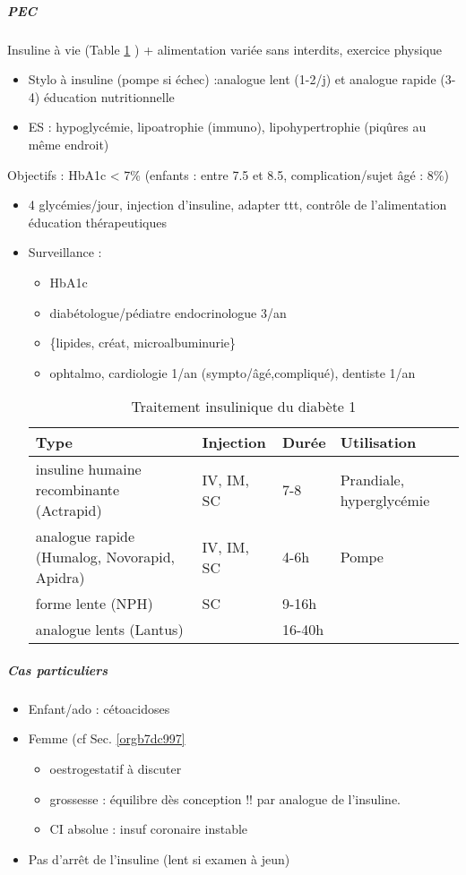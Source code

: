 \documentclass[11pt]{article}
\begin{document}
\subparagraph{PEC}
\label{sec:org1c860a3}
Insuline à vie (Table \ref{tab:org1f401a4} ) + alimentation variée sans interdits, exercice physique
\begin{itemize}
\item Stylo à insuline (pompe si échec) :analogue lent (1-2/j) et analogue rapide (3-4) \thus
éducation nutritionnelle
\item ES : hypoglycémie, lipoatrophie (immuno), lipohypertrophie (piqûres au même endroit)
\end{itemize}

Objectifs : HbA1c < 7\% (enfants : entre 7.5 et 8.5, complication/sujet âgé : 8\%)
\begin{itemize}
\item 4 glycémies/jour, injection d'insuline, adapter ttt, contrôle de l'alimentation \thus
éducation thérapeutiques
\item Surveillance :
\begin{itemize}
\item HbA1c
\item diabétologue/pédiatre endocrinologue 3/an
\item \{lipides, créat, microalbuminurie\}
\item ophtalmo, cardiologie 1/an (sympto/âgé,compliqué), dentiste 1/an
\end{itemize}

\begin{table}[htbp]
\caption{\label{tab:org1f401a4}
Traitement insulinique du diabète 1}
\centering
\begin{tabular}{llll}
Type & Injection & Durée & Utilisation\\
\hline
insuline humaine recombinante (Actrapid) & IV, IM, SC & 7-8 & Prandiale, hyperglycémie\\
analogue rapide (Humalog, Novorapid, Apidra) & IV, IM, SC & 4-6h & Pompe\\
forme lente (NPH) & SC & 9-16h & \\
analogue lents (Lantus) &  & 16-40h & \\
\end{tabular}
\end{table}
\end{itemize}


\subparagraph{Cas particuliers}
\label{sec:org6eb9d3d}
\begin{itemize}
\item Enfant/ado : \danger cétoacidoses
\item Femme (cf Sec. \ref{orgb7dc997}
\begin{itemize}
\item oestrogestatif à discuter
\item grossesse : équilibre dès conception !! par analogue de l'insuline.
\item CI absolue : insuf coronaire instable
\end{itemize}
\item Pas d'arrêt de l'insuline (lent si examen à jeun)
\end{itemize}
\end{document}
